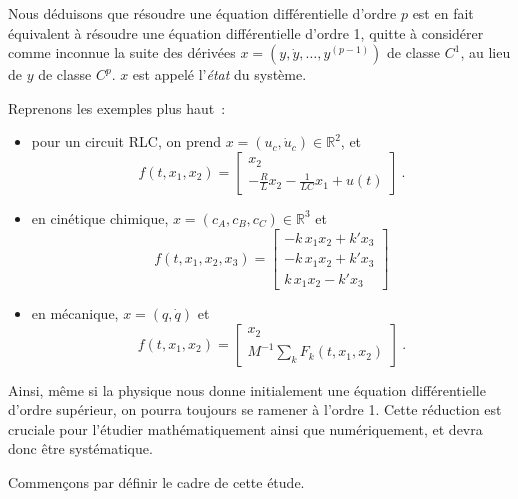 Nous déduisons que résoudre une équation différentielle d'ordre \(p\)
est en fait équivalent à résoudre une équation différentielle d'ordre 1,
quitte à considérer comme inconnue la suite des dérivées
\(x=(y,\dot{y},\ldots,y^{(p-1)})\) de classe \(C^1\), au lieu de \(y\)
de classe \(C^p\). \(x\) est appelé l'\emph{état} du système.

\hypertarget{ex_reducOrdre1}{}
\begin{exemple}\label{ex_reducOrdre1}
Reprenons les exemples plus haut~:

\begin{itemize}
\tightlist
\item
  pour un circuit RLC, on prend \(x=(u_c,\dot{u}_c)\in \mathbb{R}^2\),
  et \[
  f(t,x_1,x_2) = 
  \left[
    \begin{matrix}
        x_2\\
        -\frac{R}{L} x_2 - \frac{1}{LC} x_1 + u(t)
    \end{matrix}
  \right] \ .
  \]
\item
  en cinétique chimique, \(x=(c_A,c_B,c_C)\in \mathbb{R}^3\) et \[
  f(t,x_1,x_2,x_3) = \left[
    \begin{matrix}
         -k \, x_1x_2 + k'x_3 \\
         -k \, x_1x_2 + k'x_3\\
         k \, x_1x_2 - k'x_3
    \end{matrix}
  \right]
  \]
\item
  en mécanique, \(x=(q,\dot{q})\) et \[
  f(t,x_1,x_2) = 
  \left[
    \begin{matrix}
        x_2\\
        M^{-1} \sum_k F_k(t,x_1,x_2)
    \end{matrix}
  \right] \ .
  \]
\end{itemize}

Ainsi, même si la physique nous donne initialement une équation
différentielle d'ordre supérieur, on pourra toujours se ramener à
l'ordre 1. Cette réduction est cruciale pour l'étudier mathématiquement
ainsi que numériquement, et devra donc être systématique.
\end{exemple}

Commençons par définir le cadre de cette étude.

